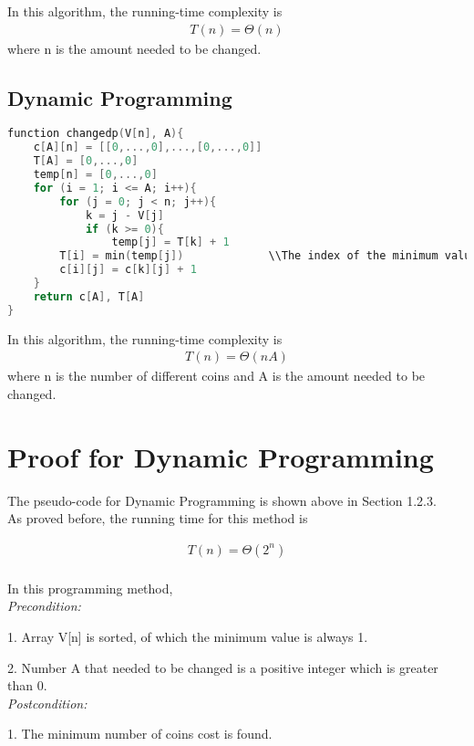 \documentclass[11pt]{scrreprt}
\begin{document}
In this algorithm, the running-time complexity is
\begin{eqnarray*}
T(n) = \Theta(n)
\end{eqnarray*}
 where n is the amount needed to be changed.
\subsection{Dynamic Programming}

\begin{lstlisting}[language=c]
function changedp(V[n], A){
	c[A][n] = [[0,...,0],...,[0,...,0]]
	T[A] = [0,...,0]
	temp[n] = [0,...,0]
	for (i = 1; i <= A; i++){
		for (j = 0; j < n; j++){
			k = j - V[j]
			if (k >= 0){
				temp[j] = T[k] + 1
		T[i] = min(temp[j])				\\The index of the minimum value of array temp is j.
		c[i][j] = c[k][j] + 1
	}
	return c[A], T[A]
}
\end{lstlisting}

In this algorithm, the running-time complexity is
\begin{eqnarray*}
T(n) = \Theta(nA)
\end{eqnarray*}
where n is the number of different coins and A is the amount needed to be changed.


\section{Proof for Dynamic Programming}


The pseudo-code for Dynamic Programming is shown above in Section 1.2.3.\\

As proved before, the running time for this method is

\begin{eqnarray*}
T(n)  =  \Theta(2^n)\\
\end{eqnarray*}

In this programming method,\\

\emph{Precondition:}

1. Array V[n] is sorted, of which the minimum value is always 1.
 
2. Number A that needed to be changed is a positive integer which is greater than 0.\\

\emph{Postcondition:}

1. The minimum number of coins cost is found.
\end{document}
